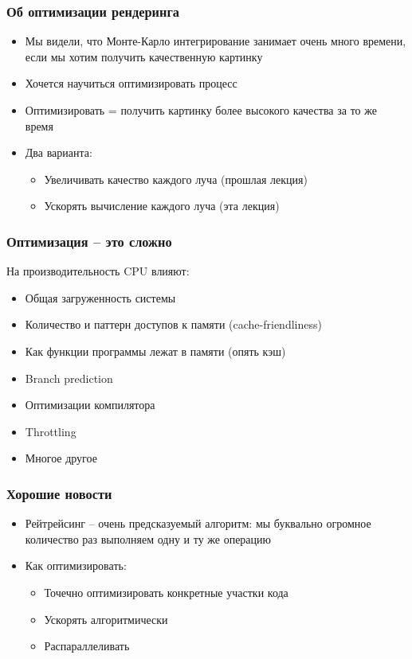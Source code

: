\documentclass[10pt]{beamer}
\begin{document}
\begin{frame}
\frametitle{Об оптимизации рендеринга}
\begin{itemize}
\item Мы видели, что Монте-Карло интегрирование занимает очень много времени, если мы хотим получить качественную картинку
\pause
\item Хочется научиться оптимизировать процесс
\pause
\item Оптимизировать = получить картинку более высокого качества за то же время
\pause
\item Два варианта:
\pause
\begin{itemize}
\item Увеличивать качество каждого луча (прошлая лекция)
\pause
\item Ускорять вычисление каждого луча (эта лекция)
\end{itemize}
\end{itemize}
\end{frame}

\begin{frame}[fragile]
\frametitle{Оптимизация -- это сложно}
На производительность CPU влияют:
\pause
\begin{itemize}
\item Общая загруженность системы
\pause
\item Количество и паттерн доступов к памяти (cache-friendliness)
\pause
\item Как функции программы лежат в памяти (опять кэш)
\pause
\item Branch prediction
\pause
\item Оптимизации компилятора
\pause
\item Throttling
\pause
\item Многое другое
\end{itemize}
\end{frame}

\begin{frame}[fragile]
\frametitle{Хорошие новости}
\begin{itemize}
\item Рейтрейсинг -- очень предсказуемый алгоритм: мы буквально огромное количество раз выполняем одну и ту же операцию
\pause
\item Как оптимизировать:
\pause
\begin{itemize}
\item Точечно оптимизировать конкретные участки кода
\pause
\item Ускорять алгоритмически
\pause
\item Распараллеливать
\end{itemize}
\end{itemize}
\end{frame}
\end{document}
